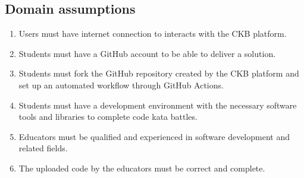 \subsection{Domain assumptions}
\begin{enumerate}[label=\textbf{DA.\arabic*}]
        \item Users must have internet connection to interacts with the CKB platform. 
        \item Students must have a GitHub account to be able to deliver a solution.
        \item Students must fork the GitHub repository created by the CKB platform and set up an automated workflow through GitHub Actions.
        \item Students must have a development environment with the necessary software tools and libraries to complete code kata battles.
        \item Educators must be qualified and experienced in software development and related fields.
        \item The uploaded code by the educators must be correct and complete.
\end{enumerate}
